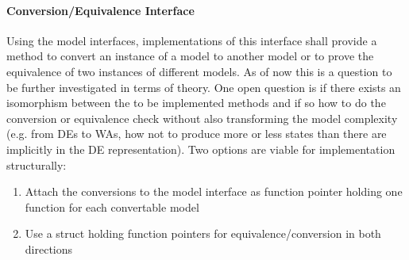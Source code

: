 			\paragraph{Conversion/Equivalence Interface}
                Using the model interfaces, implementations of this interface shall provide a method to convert an instance of a model to another model or to prove the equivalence of two instances of different models. As of now this is a question to be further investigated in terms of theory. One open question is if there exists an isomorphism between the to be implemented methods and if so how to do the conversion or equivalence check without also transforming the model complexity (e.g. from DEs to WAs, how not to produce more or less states than there are implicitly in the DE representation). Two options are viable for implementation structurally: 
                \begin{enumerate}
                 \item Attach the conversions to the model interface as function pointer holding one function for each convertable model
                 \item Use a struct holding function pointers for equivalence/conversion in both directions
                \end{enumerate}
            

